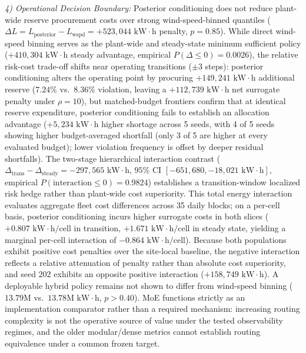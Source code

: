 \documentclass[
  journal]{IEEEtran}
\begin{document}
\textit{4) Operational Decision Boundary:} Posterior conditioning does
not reduce plant-wide reserve procurement costs over strong
wind-speed-binned quantiles
(\(\Delta L = L_{\text{posterior}} - L_{\text{wspd}} = +523{,}044\text{ kW}\cdot\text{h}\)
penalty, \(p=0.85\)). While direct wind-speed binning serves as the
plant-wide and steady-state minimum sufficient policy
(\(+410{,}304\text{ kW}\cdot\text{h}\) steady advantage, empirical
\(P(\Delta \le 0) = 0.0026\)), the relative risk-cost trade-off shifts
near operating transitions (\(\pm 3\) steps): posterior conditioning
alters the operating point by procuring
\(+149{,}241\text{ kW}\cdot\text{h}\) additional reserve (\(7.24\%\)
vs.~\(8.36\%\) violation, leaving a
\(+112{,}739\text{ kW}\cdot\text{h}\) net surrogate penalty under
\(\rho=10\)), but matched-budget frontiers confirm that at identical
reserve expenditure, posterior conditioning fails to establish an
allocation advantage (\(+5{,}234\text{ kW}\cdot\text{h}\) higher
shortage across 5 seeds, with 4 of 5 seeds showing higher
budget-averaged shortfall (only 3 of 5 are higher at every evaluated
budget); lower violation frequency is offset by deeper residual
shortfalls). The two-stage hierarchical interaction contrast
(\(\Delta_{\text{trans}} - \Delta_{\text{steady}} = -297{,}565\text{ kW}\cdot\text{h}\),
\(95\%\text{ CI } [-651{,}680, -18{,}021\text{ kW}\cdot\text{h}]\),
empirical \(P(\text{interaction} \le 0) = 0.9824\)) establishes a
transition-window localized risk hedge rather than plant-wide cost
superiority. This total energy interaction evaluates aggregate fleet
cost differences across 35 daily blocks; on a per-cell basis, posterior
conditioning incurs higher surrogate costs in both slices
(\(+0.807\text{ kW}\cdot\text{h/cell}\) in transition,
\(+1.671\text{ kW}\cdot\text{h/cell}\) in steady state, yielding a
marginal per-cell interaction of
\(-0.864\text{ kW}\cdot\text{h/cell}\)). Because both populations
exhibit positive cost penalties over the site-local baseline, the
negative interaction reflects a relative attenuation of penalty rather
than absolute cost superiority, and seed 202 exhibits an opposite
positive interaction (\(+158{,}749\text{ kW}\cdot\text{h}\)). A
deployable hybrid policy remains not shown to differ from wind-speed
binning (\(13.79\text{M}\) vs.~\(13.78\text{M kW}\cdot\text{h}\),
\(p > 0.40\)). MoE functions strictly as an implementation comparator
rather than a required mechanism: increasing routing complexity is not
the operative source of value under the tested observability regimes,
and the older modular/dense metrics cannot establish routing equivalence
under a common frozen target.
\end{document}
